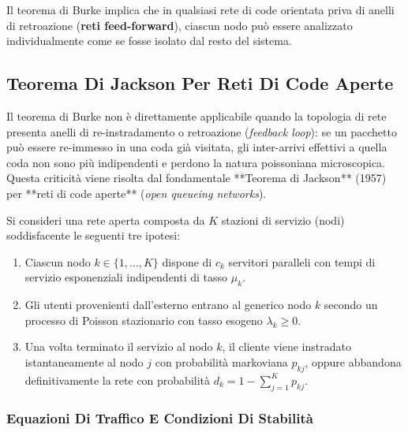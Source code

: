 \documentclass[11pt, a4paper]{article}
\begin{document}
Il teorema di Burke implica che in qualsiasi rete di code orientata priva di anelli di retroazione (\textbf{reti feed-forward}), ciascun nodo può essere analizzato individualmente come se fosse isolato dal resto del sistema.

\subsection{Teorema Di Jackson Per Reti Di Code Aperte}

Il teorema di Burke non è direttamente applicabile quando la topologia di rete presenta anelli di re-instradamento o retroazione (\emph{feedback loop}): se un pacchetto può essere re-immesso in una coda già visitata, gli inter-arrivi effettivi a quella coda non sono più indipendenti e perdono la natura poissoniana microscopica. Questa criticità viene risolta dal fondamentale **Teorema di Jackson** (1957) per **reti di code aperte** (\emph{open queueing networks}).


Si consideri una rete aperta composta da $K$ stazioni di servizio (nodi) soddisfacente le seguenti tre ipotesi:
\begin{enumerate}[noitemsep]
    \item Ciascun nodo $k \in \{1, \dots, K\}$ dispone di $c_k$ servitori paralleli con tempi di servizio esponenziali indipendenti di tasso $\mu_k$.
    \item Gli utenti provenienti dall'esterno entrano al generico nodo $k$ secondo un processo di Poisson stazionario con tasso esogeno $\lambda_k \ge 0$.
    \item Una volta terminato il servizio al nodo $k$, il cliente viene instradato istantaneamente al nodo $j$ con probabilità markoviana $p_{kj}$, oppure abbandona definitivamente la rete con probabilità $d_k = 1 - \sum_{j=1}^K p_{kj}$.
\end{enumerate}


\subsubsection{Equazioni Di Traffico E Condizioni Di Stabilità}
\end{document}
